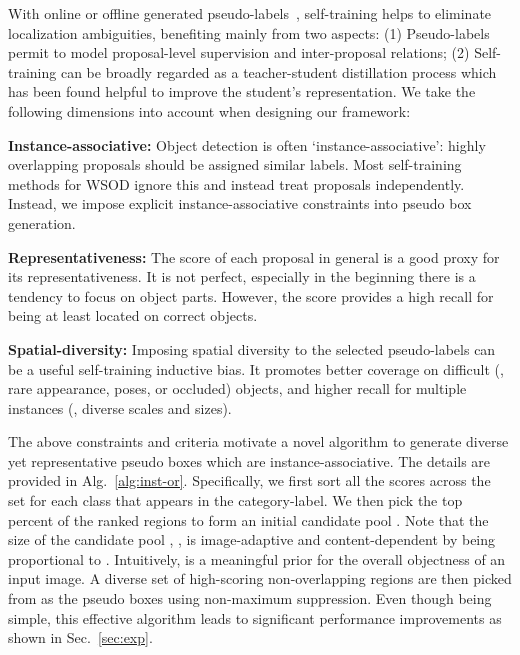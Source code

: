 \documentclass[10pt,twocolumn,letterpaper]{article}
\begin{document}
With online or offline generated pseudo-labels~\cite{tang2018pcl, krishna-cvpr2016, Zhang_2018_CVPR}, self-training helps to eliminate localization ambiguities, benefiting mainly from two aspects: (1) Pseudo-labels permit to model proposal-level supervision and inter-proposal relations; (2) Self-training can be broadly regarded as a teacher-student distillation process which has been found helpful to improve the student's representation. We take the following dimensions into account when designing our framework: 

\noindent\textbf{Instance-associative:} Object detection is often `instance-associative': highly overlapping proposals should be assigned similar labels. Most self-training methods for WSOD ignore this  and instead treat  proposals  independently. Instead, we impose explicit instance-associative constraints into pseudo box generation. 

\noindent\textbf{Representativeness:} The score of each proposal in general is a good proxy for its representativeness. It is not perfect, especially in the beginning there is a tendency to focus on object parts. However, the score provides a high recall for being at least located on correct objects. 

\noindent\textbf{Spatial-diversity:} Imposing spatial diversity to the selected pseudo-labels can be a useful self-training inductive bias. It promotes better coverage on difficult (\eg, rare appearance, poses, or occluded) objects, and higher recall for multiple instances (\eg, diverse scales and sizes).

The above constraints and criteria motivate  a novel algorithm  to generate diverse yet representative pseudo boxes which are  instance-associative. The details are provided in Alg.~\ref{alg:inst-or}. Specifically, we first sort all the scores across the set  for each class  that appears in the category-label. We then pick the top  percent of the ranked regions to form an initial candidate pool . Note that the size of the candidate pool , \ie,  is image-adaptive and content-dependent by being proportional to . Intuitively,  is a meaningful prior for the overall objectness of an input image. A diverse set of high-scoring non-overlapping regions are then picked from  as the pseudo boxes  using non-maximum suppression. Even though being simple, this effective algorithm leads to significant performance improvements as shown in Sec.~\ref{sec:exp}. 
\end{document}
